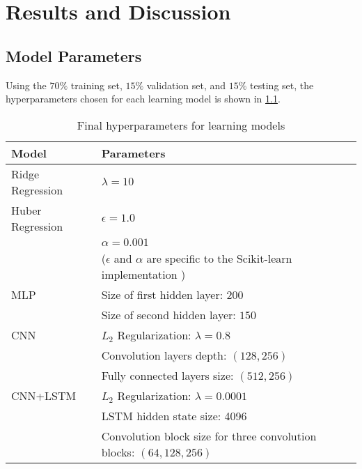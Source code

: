 \chapter{Results and Discussion}

\section{Model Parameters}

Using the $70\%$ training set, $15\%$ validation set, and $15\%$ testing set, the hyperparameters chosen for each learning model is shown in \cref{tab:hyperparam}.

\begin{table}[h]
	\centering
	\caption{Final hyperparameters for learning models}
	\label{tab:hyperparam}
	\begin{tabular}{@{}ll}
		\toprule
		Model                & Parameters                                                                                    \\ \midrule
		Ridge Regression     & $\lambda=10$                                                                                  \\ \midrule
		Huber Regression     & $\epsilon = 1.0$                                                                              \\
		                     & $\alpha=0.001$                                                                                \\
		                     & ($\epsilon$ and $\alpha$ are specific to the Scikit-learn implementation \cite{scikit-learn}) \\\midrule
		\acs{MLP}            & Size of first hidden layer: $200$                                                             \\
		                     & Size of second hidden layer: $150$                                                            \\ \midrule
		\acs{CNN}            & $L_2$ Regularization: $\lambda=0.8$                                                           \\
		                     & Convolution layers depth: $(128, 256)$                                                        \\
		                     & Fully connected layers size: $(512, 256)$                                                     \\ \midrule
		\acs{CNN}+\acs{LSTM} & $L_2$ Regularization: $\lambda=0.0001$                                                             \\
		                     & \acs{LSTM} hidden state size: 4096                                                            \\
		                     & Convolution block size for three convolution blocks: $(64, 128, 256)$                         \\ \bottomrule
	\end{tabular}
\end{table}


